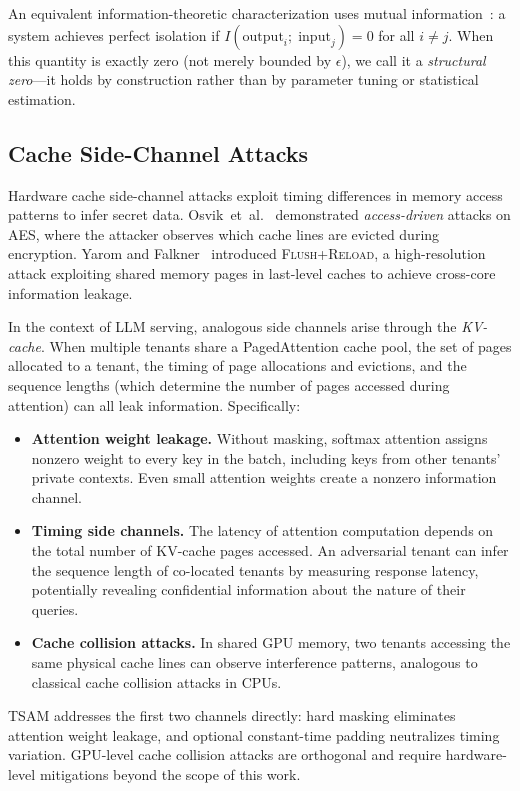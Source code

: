 \documentclass[11pt]{article}
\begin{document}
An equivalent information-theoretic characterization uses mutual
information~\citep{shannon1948mathematical, cover2006elements}: a system
achieves perfect isolation if
$I(\mathrm{output}_i;\;\mathrm{input}_j) = 0$ for all $i \neq j$.  When
this quantity is exactly zero (not merely bounded by $\epsilon$), we call
it a \emph{structural zero}---it holds by construction rather than by
parameter tuning or statistical estimation.

\subsection{Cache Side-Channel Attacks}
\label{sec:bg_sidechannel}

Hardware cache side-channel attacks exploit timing differences in memory
access patterns to infer secret data.
Osvik~et~al.~\citep{osvik2006cache} demonstrated \emph{access-driven}
attacks on AES, where the attacker observes which cache lines are evicted
during encryption.  Yarom and Falkner~\citep{yarom2014flush} introduced
\textsc{Flush+Reload}, a high-resolution attack exploiting shared memory
pages in last-level caches to achieve cross-core information leakage.

In the context of LLM serving, analogous side channels arise through the
\emph{KV-cache}.  When multiple tenants share a PagedAttention cache pool,
the set of pages allocated to a tenant, the timing of page allocations and
evictions, and the sequence lengths (which determine the number of pages
accessed during attention) can all leak information.  Specifically:
\begin{itemize}[leftmargin=*,itemsep=2pt]
  \item \textbf{Attention weight leakage.} Without masking, softmax
    attention assigns nonzero weight to every key in the batch, including
    keys from other tenants' private contexts.  Even small attention
    weights create a nonzero information channel.
  \item \textbf{Timing side channels.} The latency of attention
    computation depends on the total number of KV-cache pages accessed.
    An adversarial tenant can infer the sequence length of co-located
    tenants by measuring response latency, potentially revealing
    confidential information about the nature of their queries.
  \item \textbf{Cache collision attacks.} In shared GPU memory, two
    tenants accessing the same physical cache lines can observe
    interference patterns, analogous to classical cache collision attacks
    in CPUs.
\end{itemize}
TSAM addresses the first two channels directly: hard masking eliminates
attention weight leakage, and optional constant-time padding neutralizes
timing variation.  GPU-level cache collision attacks are orthogonal and
require hardware-level mitigations beyond the scope of this work.
\end{document}
